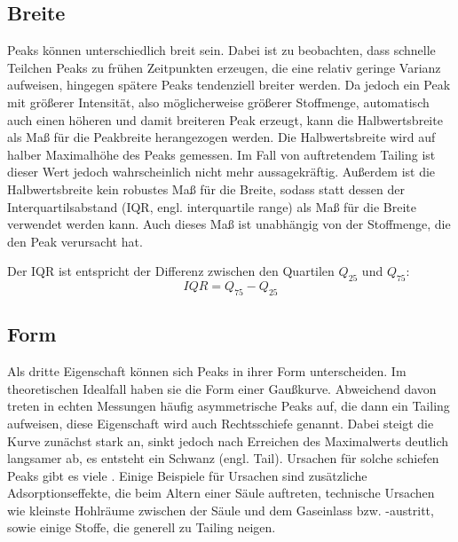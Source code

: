 \subsection{Breite}
Peaks können unterschiedlich breit sein. Dabei ist zu beobachten, dass schnelle Teilchen Peaks zu frühen Zeitpunkten erzeugen, die eine relativ geringe Varianz aufweisen, hingegen spätere Peaks tendenziell breiter werden.
Da jedoch ein Peak mit größerer Intensität, also möglicherweise größerer Stoffmenge, automatisch auch einen höheren und damit breiteren Peak erzeugt, kann die Halbwertsbreite als Maß für die Peakbreite herangezogen werden. Die Halbwertsbreite wird auf halber Maximalhöhe des Peaks gemessen. Im Fall von auftretendem Tailing ist dieser Wert jedoch wahrscheinlich nicht mehr aussagekräftig. Außerdem ist die Halbwertsbreite kein robustes Maß für die Breite, sodass statt dessen der Interquartilsabstand (IQR, engl. interquartile range) als Maß für die Breite verwendet werden kann. Auch dieses Maß ist unabhängig von der Stoffmenge, die den Peak verursacht hat. 

Der IQR ist entspricht der Differenz zwischen den Quartilen $Q_{25}$ und $Q_{75}$:
\begin{equation}
IQR = Q_{75} -Q_{25}
\end{equation}

 

\subsection{Form}
Als dritte Eigenschaft können sich Peaks in ihrer Form unterscheiden. Im theoretischen Idealfall haben sie die Form einer Gaußkurve. %
Abweichend davon treten in echten Messungen häufig asymmetrische Peaks auf, die dann ein Tailing aufweisen, diese Eigenschaft wird auch Rechtsschiefe genannt. Dabei steigt die Kurve zunächst stark an, sinkt jedoch nach Erreichen des Maximalwerts deutlich langsamer ab, es entsteht ein Schwanz (engl. Tail).
Ursachen für solche schiefen Peaks gibt es viele \citep{kolb2003, Moretti2004, Giddings1963}. Einige Beispiele für Ursachen sind zusätzliche Adsorptionseffekte, die beim Altern einer Säule auftreten, technische Ursachen wie kleinste Hohlräume zwischen der Säule und dem Gaseinlass bzw. -austritt, sowie einige Stoffe, die generell zu Tailing neigen. %

